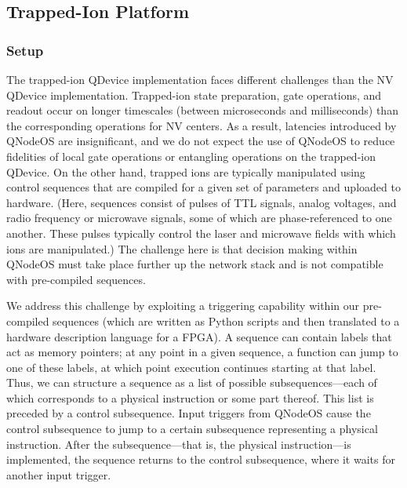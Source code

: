 \subsection{Trapped-Ion Platform}
\label{qnodeos:sec:trapped-ion-platform}

\subsubsection{Setup}

The trapped-ion \ac{QDevice} implementation faces different challenges than the \ac{NV} \ac{QDevice} implementation. Trapped-ion state preparation, gate operations, and readout occur on longer timescales (between microseconds and milliseconds) than the corresponding operations for \ac{NV} centers. As a result, latencies introduced by \ac{QNodeOS} are insignificant, and we do not expect the use of \ac{QNodeOS} to reduce fidelities of local gate operations or entangling operations on the trapped-ion \ac{QDevice}. On the other hand, trapped ions are typically manipulated using control sequences that are compiled for a given set of parameters and uploaded to hardware. (Here, sequences consist of pulses of \ac{TTL} signals, analog voltages, and radio frequency or microwave signals, some of which are phase-referenced to one another. These pulses typically control the laser and microwave fields with which ions are manipulated.) The challenge here is that decision making within \ac{QNodeOS} must take place further up the network stack and is not compatible with pre-compiled sequences.

We address this challenge by exploiting a triggering capability within our pre-compiled sequences (which are written as Python scripts and then translated to a hardware description language for a \ac{FPGA}). A sequence can contain labels that act as memory pointers; at any point in a given sequence, a function can jump to one of these labels, at which point execution continues starting at that label. Thus, we can structure a sequence as a list of possible subsequences---each of which corresponds to a physical instruction or some part thereof. This list is preceded by a control subsequence. Input triggers from \ac{QNodeOS} cause the control subsequence to jump to a certain subsequence representing a physical instruction. After the subsequence---that is, the physical instruction---is implemented, the sequence returns to the control subsequence, where it waits for another input trigger.

